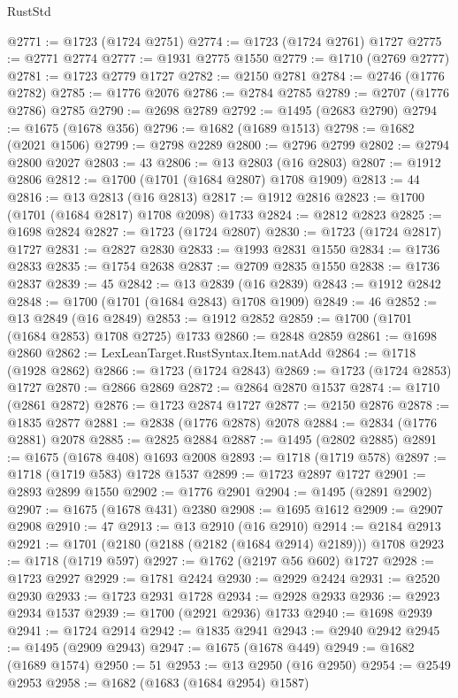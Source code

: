 \begin{lexlean}{RustStd}
\begin{coremodule}
@2771 := @1723 (@1724 @2751)
@2774 := @1723 (@1724 @2761) @1727
@2775 := @2771 @2774
@2777 := @1931 @2775 @1550
@2779 := @1710 (@2769 @2777)
@2781 := @1723 @2779 @1727
@2782 := @2150 @2781
@2784 := @2746 (@1776 @2782)
@2785 := @1776 @2076
@2786 := @2784 @2785
@2789 := @2707 (@1776 @2786) @2785
@2790 := @2698 @2789
@2792 := @1495 (@2683 @2790)
@2794 := @1675 (@1678 @356)
@2796 := @1682 (@1689 @1513)
@2798 := @1682 (@2021 @1506)
@2799 := @2798 @2289
@2800 := @2796 @2799
@2802 := @2794 @2800 @2027
@2803 := 43
@2806 := @13 @2803 (@16 @2803)
@2807 := @1912 @2806
@2812 := @1700 (@1701 (@1684 @2807) @1708 @1909)
@2813 := 44
@2816 := @13 @2813 (@16 @2813)
@2817 := @1912 @2816
@2823 := @1700 (@1701 (@1684 @2817) @1708 @2098) @1733
@2824 := @2812 @2823
@2825 := @1698 @2824
@2827 := @1723 (@1724 @2807)
@2830 := @1723 (@1724 @2817) @1727
@2831 := @2827 @2830
@2833 := @1993 @2831 @1550
@2834 := @1736 @2833
@2835 := @1754 @2638
@2837 := @2709 @2835 @1550
@2838 := @1736 @2837
@2839 := 45
@2842 := @13 @2839 (@16 @2839)
@2843 := @1912 @2842
@2848 := @1700 (@1701 (@1684 @2843) @1708 @1909)
@2849 := 46
@2852 := @13 @2849 (@16 @2849)
@2853 := @1912 @2852
@2859 := @1700 (@1701 (@1684 @2853) @1708 @2725) @1733
@2860 := @2848 @2859
@2861 := @1698 @2860
@2862 := LexLeanTarget.RustSyntax.Item.natAdd
@2864 := @1718 (@1928 @2862)
@2866 := @1723 (@1724 @2843)
@2869 := @1723 (@1724 @2853) @1727
@2870 := @2866 @2869
@2872 := @2864 @2870 @1537
@2874 := @1710 (@2861 @2872)
@2876 := @1723 @2874 @1727
@2877 := @2150 @2876
@2878 := @1835 @2877
@2881 := @2838 (@1776 @2878) @2078
@2884 := @2834 (@1776 @2881) @2078
@2885 := @2825 @2884
@2887 := @1495 (@2802 @2885)
@2891 := @1675 (@1678 @408) @1693 @2008
@2893 := @1718 (@1719 @578)
@2897 := @1718 (@1719 @583) @1728 @1537
@2899 := @1723 @2897 @1727
@2901 := @2893 @2899 @1550
@2902 := @1776 @2901
@2904 := @1495 (@2891 @2902)
@2907 := @1675 (@1678 @431) @2380
@2908 := @1695 @1612
@2909 := @2907 @2908
@2910 := 47
@2913 := @13 @2910 (@16 @2910)
@2914 := @2184 @2913
@2921 := @1701 (@2180 (@2188 (@2182 (@1684 @2914) @2189))) @1708
@2923 := @1718 (@1719 @597)
@2927 := @1762 (@2197 @56 @602) @1727
@2928 := @1723 @2927
@2929 := @1781 @2424
@2930 := @2929 @2424
@2931 := @2520 @2930
@2933 := @1723 @2931 @1728
@2934 := @2928 @2933
@2936 := @2923 @2934 @1537
@2939 := @1700 (@2921 @2936) @1733
@2940 := @1698 @2939
@2941 := @1724 @2914
@2942 := @1835 @2941
@2943 := @2940 @2942
@2945 := @1495 (@2909 @2943)
@2947 := @1675 (@1678 @449)
@2949 := @1682 (@1689 @1574)
@2950 := 51
@2953 := @13 @2950 (@16 @2950)
@2954 := @2549 @2953
@2958 := @1682 (@1683 (@1684 @2954) @1587)

\end{coremodule}
\end{lexlean}
